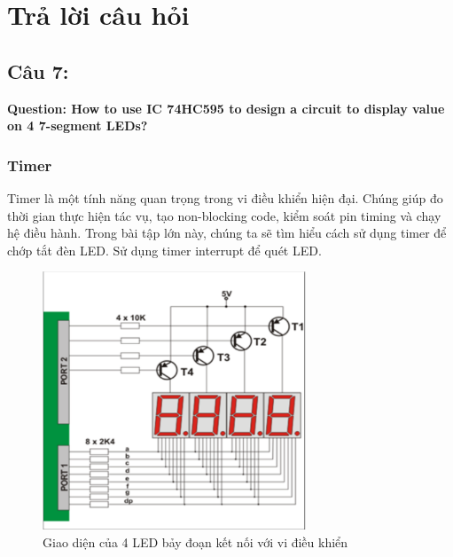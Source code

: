 \section{Trả lời câu hỏi}

\subsection{Câu 7:}
\textbf{Question: How to use IC 74HC595 to design a circuit to display value on 4 7-segment
LEDs?}
\subsubsection{Timer}
Timer là một tính năng quan trọng trong vi điều khiển hiện đại. Chúng giúp đo thời gian thực hiện tác vụ, tạo non-blocking code, kiểm soát pin timing và chạy hệ điều hành. Trong bài tập lớn này, chúng ta sẽ tìm hiểu cách sử dụng timer để chớp tắt đèn LED. Sử dụng timer interrupt để quét LED.
\begin{figure}[ht]
    \centering
    \includegraphics[width=0.7\textwidth]{graphics/LED_7seg.PNG}
    \caption{Giao diện của 4 LED bảy đoạn kết nối với vi điều khiển}
\end{figure}

